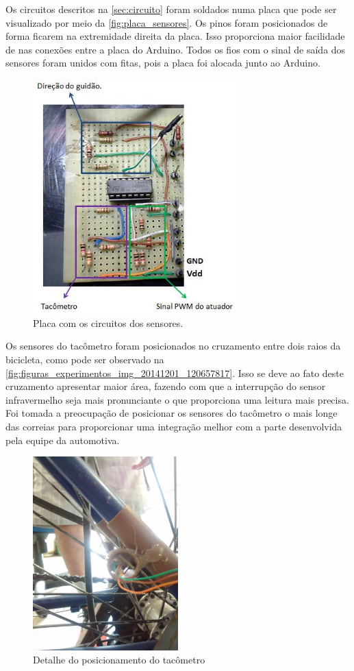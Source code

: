 Os circuitos descritos na \autoref{sec:circuito} foram soldados numa placa que pode ser visualizado por meio da \autoref{fig:placa_sensores}. Os pinos foram posicionados de forma ficarem na extremidade direita da placa. Isso proporciona maior facilidade de nas conexões entre a placa do Arduino. Todos os fios com o sinal de saída dos sensores foram unidos com fitas, pois a placa foi alocada junto ao Arduino. 

\begin{figure}[!htb]
        \centering
        \includegraphics[width=0.7\textwidth]
{figuras/10822194_753168071424794_1809189156_n.jpg}
        \caption{Placa com os circuitos dos sensores.}
        \label{fig:placa_sensores}
\end{figure}

Os sensores do tacômetro foram posicionados no cruzamento entre dois raios da bicicleta, como pode ser observado na \autoref{fig:figuras_experimentos_img_20141201_120657817}. Isso se deve ao fato deste cruzamento apresentar maior área, fazendo com que a interrupção do sensor infravermelho seja mais pronunciante o que proporciona uma leitura mais precisa. Foi tomada a preocupação de posicionar os sensores do tacômetro o mais longe das correias para proporcionar uma integração melhor com a parte desenvolvida pela equipe da automotiva.


\begin{figure}[!htb]
  \centering
	\includegraphics[width=0.5\textwidth]{figuras/experimentos/IMG_20141201_120657817}
  \caption{Detalhe do posicionamento do tacômetro}
  \label{fig:figuras_experimentos_img_20141201_120657817}
\end{figure}
